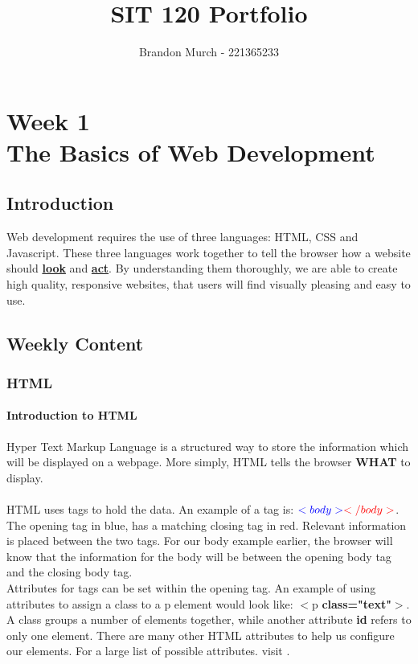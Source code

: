 \documentclass[12pt]{report}
\title{SIT 120 Portfolio}
\author{Brandon Murch - 221365233}
\newcommand\Chapter[2]{
	\def\chaptername{#2}
	\chapter[#2]{#1\\[1ex]\large#2}
}
\begin{document}
	\maketitle
	\tableofcontents

	
	
	
	
	
	
	
	


	


	\Chapter{Week 1}{The Basics of Web Development}
		\section{Introduction}
			Web development requires the use of three languages: HTML, CSS and Javascript. These three languages work together to tell the browser how a website should \underline{\textbf{look}} and \underline{\textbf{act}}. By understanding them thoroughly, we are able to create high quality, responsive websites, that users will find visually pleasing and easy to use.\\
		\section{Weekly Content}
			\subsection{HTML}
				\subsubsection{Introduction to HTML}

					Hyper Text Markup Language is a structured way to store the information which will be displayed on a webpage. More simply, HTML tells the browser \textbf{WHAT} to display.\\
					\\
					 HTML uses tags to hold the data. An example of a tag is: $\color{blue}<body>\color{red}</body>$. The opening tag in blue, has a matching closing tag in red.  Relevant information is placed between the two tags. For our body example earlier, the browser will know that the information for the body will be between the opening body tag and the closing body tag.\\

					 Attributes for tags can be set within the opening tag. An example of using attributes to assign a class to a p element would look like: $<$p \textbf{class="text"}$>$.  A class groups a number of elements together, while another attribute \textbf{id} refers to only one element. There are many other HTML attributes to help us configure our elements. For a large list of possible attributes. visit .\\
\end{document}
